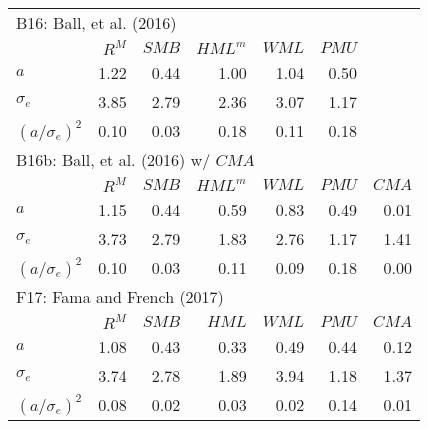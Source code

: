 
\begin{tabular}{lrrrrrr}
  \toprule
  \multicolumn{7}{l}{B16: Ball, et al. (2016)}  \\
                                &  $R^M$ &  $SMB$ &$HML^m$ &  $WML$ &  $PMU$ &   \\
  $a$                           &  1.22  &  0.44  &  1.00  &  1.04  &  0.50  &   \\
  $\sigma_e$                    &  3.85  &  2.79  &  2.36  &  3.07  &  1.17  &   \\
  $\left( a/\sigma_e\right) ^2$ &  0.10  &  0.03  &  0.18  &  0.11  &  0.18  &   \\
[1em]
  \multicolumn{7}{l}{B16b: Ball, et al. (2016) w/ $CMA$}  \\
                                &  $R^M$ &  $SMB$ &$HML^m$ &  $WML$ &  $PMU$ &  $CMA$ \\
  $a$                           &  1.15  &  0.44  &  0.59  &  0.83  &  0.49  &  0.01  \\
  $\sigma_e$                    &  3.73  &  2.79  &  1.83  &  2.76  &  1.17  &  1.41  \\
  $\left( a/\sigma_e\right) ^2$ &  0.10  &  0.03  &  0.11  &  0.09  &  0.18  &  0.00  \\
[1em]
  \multicolumn{7}{l}{F17: Fama and French (2017)}  \\
                                &  $R^M$ &  $SMB$ &  $HML$ &  $WML$ &  $PMU$ &  $CMA$ \\
  $a$                           &  1.08  &  0.43  &  0.33  &  0.49  &  0.44  &  0.12  \\
  $\sigma_e$                    &  3.74  &  2.78  &  1.89  &  3.94  &  1.18  &  1.37  \\
  $\left( a/\sigma_e\right) ^2$ &  0.08  &  0.02  &  0.03  &  0.02  &  0.14  &  0.01  \\
  \bottomrule
\end{tabular}

